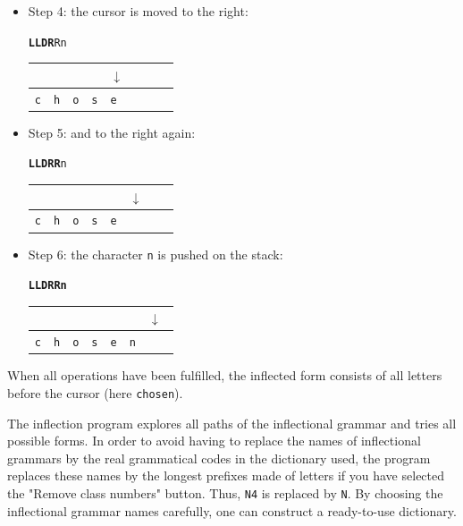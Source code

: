 \begin{itemize}
\bigskip
\item Step 4: the cursor is moved to the right:

\begin{center}
\texttt{\textbf{LLDR}Rn}

\begin{tabular}{|l|l|l|l|l|l|l|l}
\multicolumn{4}{l}{} & \multicolumn{4}{l}{$\downarrow$} \\
\hline
\verb+c+ & \verb+h+ & \verb+o+ & \verb+s+ & \verb+e+ & \verb+ + & \verb+ + & \\
\hline
\end{tabular}
\end{center}

\bigskip
\item Step 5: and to the right again:

\begin{center}
\texttt{\textbf{LLDRR}n}

\begin{tabular}{|l|l|l|l|l|l|l|l}
\multicolumn{5}{l}{} & \multicolumn{3}{l}{$\downarrow$} \\
\hline
\verb+c+ & \verb+h+ & \verb+o+ & \verb+s+ & \verb+e+ & \verb+ + & \verb+ + & \\
\hline
\end{tabular}
\end{center}

\bigskip
\item Step 6: the character \verb+n+ is pushed on the stack:

\begin{center}
\texttt{\textbf{LLDRRn}}

\begin{tabular}{|l|l|l|l|l|l|l|l}
\multicolumn{6}{l}{} & \multicolumn{2}{l}{$\downarrow$} \\
\hline
\verb+c+ & \verb+h+ & \verb+o+ & \verb+s+ & \verb+e+ & \verb+n+ & \verb+ + & \\
\hline
\end{tabular}
\end{center}
\end{itemize}

\bigskip
\noindent When all operations have been fulfilled, the inflected form
consists of all letters before the cursor (here \verb+chosen+).

\bigskip
\noindent The inflection program
explores all paths of the inflectional grammar and tries all possible forms. In
order to avoid having to replace the names of inflectional grammars by the real
grammatical codes in the dictionary used, the program replaces these names by the
longest prefixes made of letters if you have selected the "Remove class numbers"
button. Thus, \verb+N4+ is replaced by \verb+N+. By choosing the inflectional
grammar names carefully, one can construct a ready-to-use dictionary.


